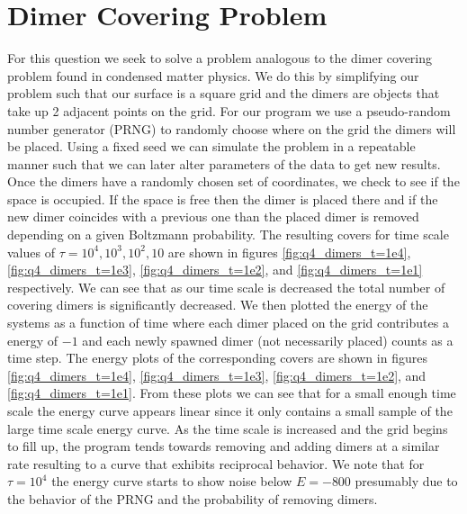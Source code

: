 \documentclass{article}
\begin{document}
\section{Dimer Covering Problem}
For this question we seek to solve a problem analogous to the dimer covering problem found in condensed matter physics. We do this by simplifying our problem such that our surface is a square grid and the dimers are objects that take up 2 adjacent points on the grid. For our program we use a pseudo-random number generator (PRNG) to randomly choose where on the grid the dimers will be placed. Using a fixed seed we can simulate the problem in a repeatable manner such that we can later alter parameters of the data to get new results. Once the dimers have a randomly chosen set of coordinates, we check to see if the space is occupied. If the space is free then the dimer is placed there and if the new dimer coincides with a previous one than the placed dimer is removed depending on a given Boltzmann probability. The resulting covers for time scale values of $\tau = 10^4, 10^3, 10^2, 10$ are shown in figures \ref{fig:q4_dimers_t=1e4}, \ref{fig:q4_dimers_t=1e3}, \ref{fig:q4_dimers_t=1e2}, and \ref{fig:q4_dimers_t=1e1} respectively. We can see that as our time scale is decreased the total number of covering dimers is significantly decreased. We then plotted the energy of the systems as a function of time where each dimer placed on the grid contributes a energy of $-1$ and each newly spawned dimer (not necessarily placed) counts as a time step. The energy plots of the corresponding covers are shown in figures \ref{fig:q4_dimers_t=1e4}, \ref{fig:q4_dimers_t=1e3}, \ref{fig:q4_dimers_t=1e2}, and \ref{fig:q4_dimers_t=1e1}. From these plots we can see that for a small enough time scale the energy curve appears linear since it only contains a small sample of the large time scale energy curve. As the time scale is increased and the grid begins to fill up, the program tends towards removing and adding dimers at a similar rate resulting to a curve that exhibits reciprocal behavior. We note that for $\tau=10^4$ the energy curve starts to show noise below $E=-800$ presumably due to the behavior of the PRNG and the probability of removing dimers.
\end{document}
